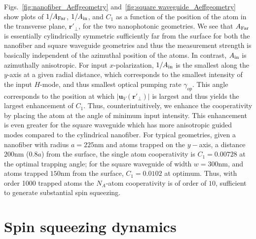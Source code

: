 \documentclass[preprint,aps,pra,onecolumn,superscriptaddress]{revtex4-1} %
\newcommand{\mbf}[1]{\mathbf{#1}}
\newcommand{\AF}{A_{\rm Far}} %
\newcommand{\Ai}{A_{\rm in}} %
\begin{document}
Figs.~\ref{fig:nanofiber_Aeffgeometry} and~\ref{fig:square waveguide_Aeffgeometry} show plots of $1/\AF$, $1/\Ai$, and $C_1$ as a function of  the position of the atom in the transverse plane, $\mbf{r}'_\perp$, for the two nanophotonic geometries.  We see that $\AF$ is essentially cylindrically symmetric sufficiently far from the surface for both the nanofiber and square waveguide geometries and thus the measurement strength is basically independent of the azimuthal position of the atoms.  In contrast, $\Ai$ is azimuthally anisotropic.  For input $x$-polarization, $1/\Ai$ is the smallest along the $y$-axis at a given radial distance, which corresponds to the smallest intensity of the input $H$-mode, and thus smallest optical pumping rate $\gamma_{op}$.  This angle corresponds to the position at which $\vert \mbf{u}_V (\mbf{r}'_\perp) \vert$ is largest and thus yields the largest enhancement of $C_1$.  Thus, counterintuitively, we enhance the cooperativity by placing the atom at the angle of minimum input intensity.   This enhancement is even greater for the square waveguide which has more anisotropic guided modes compared to the cylindrical nanofiber.  For typical geometries, given a nanofiber with radius $a = 225$nm and atoms trapped on the $y-$axis, a distance $200$nm ($0.8a$) from the surface, the single atom cooperativity is $C_1 =0.00728$ at the optimal trapping angle; for the square waveguide of width $w =300$nm, and atoms trapped $150$nm from the surface, $C_1 =0.0102$ at optimum.  Thus, with order 1000 trapped atoms the $N_A$-atom cooperativity is of order of $ 10 $, sufficient to generate substantial spin squeezing.

\section{Spin squeezing dynamics}
\end{document}
